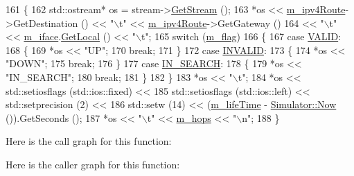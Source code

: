 \begin{DoxyCode}
161 \{
162   std::ostream* os = stream->\hyperlink{classns3_1_1OutputStreamWrapper_a0cf30a4188ab6fdae2b2ab74db11acc2}{GetStream} ();
163   *os << \hyperlink{classns3_1_1aodv_1_1RoutingTableEntry_a7027a4ad689f53a7c88edfc39edb68cb}{m\_ipv4Route}->GetDestination () << \textcolor{stringliteral}{"\(\backslash\)t"} << \hyperlink{classns3_1_1aodv_1_1RoutingTableEntry_a7027a4ad689f53a7c88edfc39edb68cb}{m\_ipv4Route}->GetGateway ()
164       << \textcolor{stringliteral}{"\(\backslash\)t"} << \hyperlink{classns3_1_1aodv_1_1RoutingTableEntry_a150a354a9c36dbdc1e65f8b0f3b1fd05}{m\_iface}.\hyperlink{classns3_1_1Ipv4InterfaceAddress_a716a425049f48b9fe6e38868b1f413f6}{GetLocal} () << \textcolor{stringliteral}{"\(\backslash\)t"};
165   \textcolor{keywordflow}{switch} (\hyperlink{classns3_1_1aodv_1_1RoutingTableEntry_ae8b0a48e515e40658c7f2f2e8e808e05}{m\_flag})
166     \{
167     \textcolor{keywordflow}{case} \hyperlink{group__aodv_gga44216921a9c725a5ab8bc19059052a26af5fecee96bb2650aa417994840b43c99}{VALID}:
168       \{
169         *os << \textcolor{stringliteral}{"UP"};
170         \textcolor{keywordflow}{break};
171       \}
172     \textcolor{keywordflow}{case} \hyperlink{group__aodv_gga44216921a9c725a5ab8bc19059052a26a0d7b8118b2af9344a91683148f1261c3}{INVALID}:
173       \{
174         *os << \textcolor{stringliteral}{"DOWN"};
175         \textcolor{keywordflow}{break};
176       \}
177     \textcolor{keywordflow}{case} \hyperlink{group__aodv_gga44216921a9c725a5ab8bc19059052a26aba44cda5a5df371b6567f70d7d8311fa}{IN\_SEARCH}:
178       \{
179         *os << \textcolor{stringliteral}{"IN\_SEARCH"};
180         \textcolor{keywordflow}{break};
181       \}
182     \}
183   *os << \textcolor{stringliteral}{"\(\backslash\)t"};
184   *os << std::setiosflags (std::ios::fixed) << 
185   std::setiosflags (std::ios::left) << std::setprecision (2) <<
186   std::setw (14) << (\hyperlink{classns3_1_1aodv_1_1RoutingTableEntry_add4e939cc8f711981b981007273139d5}{m\_lifeTime} - \hyperlink{classns3_1_1Simulator_ac3178fa975b419f7875e7105be122800}{Simulator::Now} ()).GetSeconds ();
187   *os << \textcolor{stringliteral}{"\(\backslash\)t"} << \hyperlink{classns3_1_1aodv_1_1RoutingTableEntry_a6dae8561857f2b7215708a317b50b089}{m\_hops} << \textcolor{stringliteral}{"\(\backslash\)n"};
188 \}
\end{DoxyCode}


Here is the call graph for this function\+:




Here is the caller graph for this function\+:


